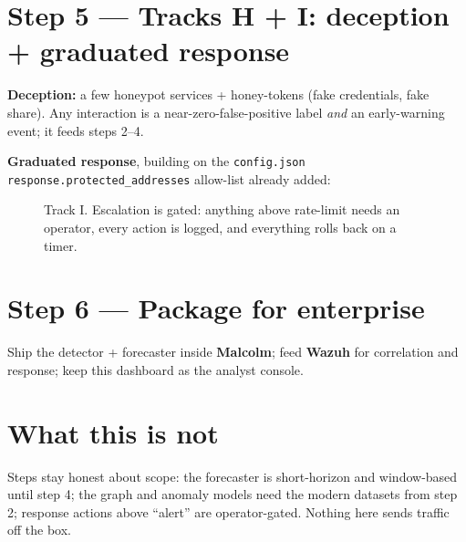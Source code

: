 \documentclass[11pt,a4paper]{article}
\begin{document}
\section{Step 5 --- Tracks H + I: deception + graduated response}
\textbf{Deception:} a few honeypot services + honey-tokens (fake credentials,
fake share). Any interaction is a near-zero-false-positive label \emph{and} an
early-warning event; it feeds steps 2--4.

\textbf{Graduated response}, building on the \texttt{config.json}
\texttt{response.protected\_addresses} allow-list already added:

\begin{figure}[H]\centering
{}
\caption{Track I. Escalation is gated: anything above rate-limit needs an
operator, every action is logged, and everything rolls back on a timer.}
\end{figure}

\section{Step 6 --- Package for enterprise}
Ship the detector + forecaster inside \textbf{Malcolm}; feed \textbf{Wazuh} for
correlation and response; keep this dashboard as the analyst console.

\section{What this is not}
Steps stay honest about scope: the forecaster is short-horizon and window-based
until step 4; the graph and anomaly models need the modern datasets from step 2;
response actions above ``alert'' are operator-gated. Nothing here sends traffic
off the box.
\end{document}
